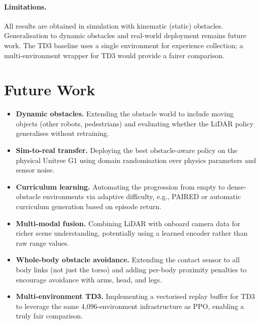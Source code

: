 \documentclass{article}
\begin{document}
\paragraph{Limitations.}
All results are obtained in simulation with kinematic (static) obstacles.
Generalisation to dynamic obstacles and real-world deployment remains future
work.
The TD3 baseline uses a single environment for experience collection; a
multi-environment wrapper for TD3 would provide a fairer comparison.

\section{Future Work}

\begin{itemize}
  \item \textbf{Dynamic obstacles.} Extending the obstacle world to include
        moving objects (other robots, pedestrians) and evaluating whether the
        LiDAR policy generalises without retraining.
  \item \textbf{Sim-to-real transfer.} Deploying the best obstacle-aware
        policy on the physical Unitree G1 using domain randomisation over
        physics parameters and sensor noise.
  \item \textbf{Curriculum learning.} Automating the progression from empty
        to dense-obstacle environments via adaptive difficulty, e.g., PAIRED
        \cite{dennis2020emergent} or automatic curriculum generation based on
        episode return.
  \item \textbf{Multi-modal fusion.} Combining LiDAR with onboard camera data
        for richer scene understanding, potentially using a learned encoder
        rather than raw range values.
  \item \textbf{Whole-body obstacle avoidance.} Extending the contact sensor
        to all body links (not just the torso) and adding per-body proximity
        penalties to encourage avoidance with arms, head, and legs.
  \item \textbf{Multi-environment TD3.} Implementing a vectorised replay
        buffer for TD3 to leverage the same 4{,}096-environment
        infrastructure as PPO, enabling a truly fair comparison.
\end{itemize}

\end{document}
